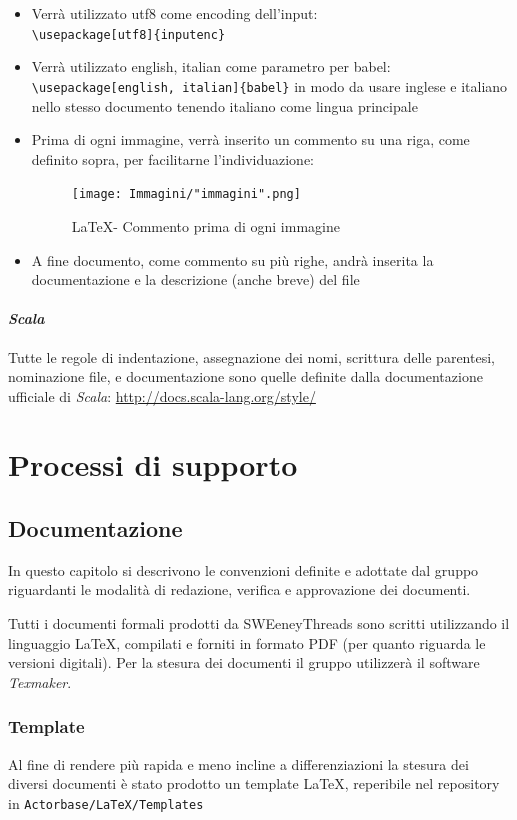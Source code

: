 \documentclass[a4paper]{report}
\newcommand{\mychapter}[2]{
	\setcounter{chapter}{#1}
	\setcounter{section}{0}
	\setcounter{subsection}{1}
	\chapter*{#2}
	\addcontentsline{toc}{chapter}{#2}
}
\begin{document}
\begin{itemize}
		\item Verrà utilizzato utf8 come encoding dell'input: \\ \verb|\usepackage[utf8]{inputenc}|
		\item Verrà utilizzato english, italian come parametro per babel: \\ 
		\verb|\usepackage[english, italian]{babel}| in modo da usare inglese e italiano nello 
		stesso documento tenendo italiano come lingua principale
		\item Prima di ogni immagine, verrà inserito un commento su una riga, come definito 
		sopra, per facilitarne l'individuazione:
		\begin{figure}[H]
			\centering
			\texttt{[image: Immagini/"immagini".png]}
			\caption{\LaTeX \space - Commento prima di ogni immagine}
		\end{figure}
		\item A fine documento, come commento su più righe, andrà inserita la documentazione e la descrizione (anche breve) del file
	\end{itemize}
	\subsubsection{\emph{Scala}}
	Tutte le regole di indentazione, assegnazione dei nomi, scrittura delle parentesi, nominazione file, e documentazione sono quelle
	definite dalla documentazione ufficiale di \emph{Scala}: \url{http://docs.scala-lang.org/style/}
	\mychapter{3}{Processi di supporto}
	\section{Documentazione} 
	In questo capitolo si descrivono le convenzioni definite e adottate dal gruppo riguardanti le 
	modalità di redazione, verifica e approvazione dei documenti.
	
	Tutti i documenti formali prodotti da SWEeneyThreads sono scritti utilizzando il linguaggio \LaTeX, 
	compilati e forniti in formato PDF (per quanto riguarda le versioni digitali). Per la stesura dei 
	documenti il gruppo utilizzerà il software \emph{Texmaker}.
	\subsection{Template}
	Al fine di rendere più rapida e meno incline a differenziazioni la stesura dei diversi documenti è stato prodotto un
	template \LaTeX, reperibile nel repository in \verb|Actorbase/LaTeX/Templates|
\end{document}
